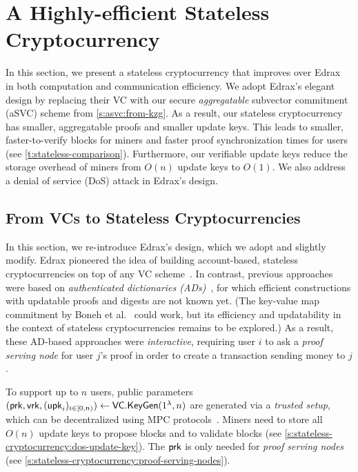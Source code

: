 \section{A Highly-efficient Stateless Cryptocurrency}
\label{s:stateless-cryptocurrency}

In this section, we present a stateless cryptocurrency that improves over Edrax~\cite{CPZ18} in both computation and communication efficiency.
We adopt Edrax's elegant design by replacing their VC with our secure \textit{aggregatable} subvector commitment (aSVC) scheme from \cref{s:asvc:from-kzg}.
As a result, our stateless cryptocurrency has smaller, aggregatable proofs and smaller update keys.
This leads to smaller, faster-to-verify blocks for miners and faster proof synchronization times for users (see \cref{t:stateless-comparison}).
Furthermore, our verifiable update keys reduce the storage overhead of miners from $O(n)$ update keys to $O(1)$.
We also address a denial of service (DoS) attack in Edrax's design.

\subsection{From VCs to Stateless Cryptocurrencies}
\label{s:stateless-cryptocurrency:edrax}
In this section, we re-introduce Edrax's design, which we adopt and slightly modify.
Edrax pioneered the idea of building account-based, stateless cryptocurrencies on top of any VC scheme~\cite{CPZ18}.
In contrast, previous approaches were based on \textit{authenticated dictionaries (ADs)}~\cite{RMCI17,Buterin17}, for which efficient constructions with updatable proofs and digests are not known yet.
(The key-value map commitment by Boneh et al.~\cite{BBF18} could work, but its efficiency and updatability in the context of stateless cryptocurrencies remains to be explored.)
As a result, these AD-based approaches were \textit{interactive}, requiring user $i$ to ask a \textit{proof serving node} for user $j$'s proof in order to create a transaction sending money to $j$.

To support up to $n$ users, public parameters $(\mathsf{prk},\mathsf{vrk},(\mathsf{upk}_i)_{i\in[0,n)})\leftarrow \mathsf{VC}.\mathsf{KeyGen}(1^{\lambda}, n)$ are generated via a \textit{trusted setup}, which can be decentralized using MPC protocols~\cite{BGM17,BGG18}.
Miners need to store all $O(n)$ update keys to propose blocks and to validate blocks (see \cref{s:stateless-cryptocurrency:dos-update-key}).
The $\mathsf{prk}$ is only needed for \textit{proof serving nodes} (see \cref{s:stateless-cryptocurrency:proof-serving-nodes}).

